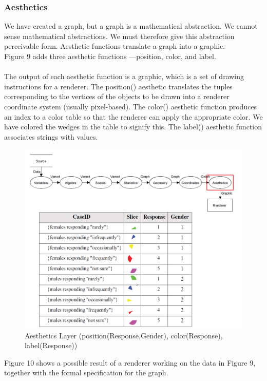 \documentclass[12pt]{article}
\begin{document}
\subsubsection{Aesthetics}
We have created a graph, but a graph is a mathematical abstraction. We cannot
sense mathematical abstractions. We must therefore give this abstraction perceivable
form. Aesthetic functions translate a graph into a graphic.\\
Figure 9
adds three aesthetic functions —position, color, and label. \\ \\
The output of each aesthetic function is a graphic, which is a set of drawing
instructions for a renderer. The position() aesthetic translates the tuples
corresponding to the vertices of the objects to be drawn into a renderer coordinate
system (usually pixel-based). The color() aesthetic function produces
an index to a color table so that the renderer can apply the appropriate color.
We have colored the wedges in the table to signify this. The label() aesthetic
function associates strings with values.
\begin{figure}[h!]
\caption{Aesthetics Layer (position(Response,Gender), color(Response), label(Response))}
\includegraphics[width=\textwidth]{pic/pre7}
\end{figure}
\newpage
Figure 10 shows a possible result of a renderer working on the data in Figure
9, together with the formal specification for the graph.
\\  \\
\end{document}
